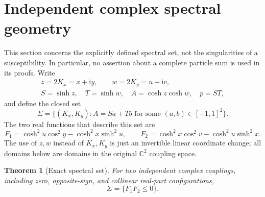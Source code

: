 \documentclass[11pt]{article}
\numberwithin{equation}{section}
\newtheorem{theorem}{Theorem}[section]
\theoremstyle{definition}
\newcommand{\C}{\mathbb C}
\newcommand{\ii}{\mathrm i}
\begin{document}
\clearpage
\tableofcontents
\clearpage

\section{Independent complex spectral geometry}
\label{geo:section}

This section concerns the explicitly defined spectral set, not the singularities
of a susceptibility.  In particular, no assertion about a complete particle
sum is used in its proofs.  Write
\[
 \begin{gathered}
 z=2K_x=x+\ii y,\qquad w=2K_y=u+\ii v,\\
 S=\sinh z,\quad T=\sinh w,\quad A=\cosh z\cosh w,\quad p=ST,
 \end{gathered}
\]
and define the closed set
\begin{equation}\label{geo:sigma}
 \Sigma=\{(K_x,K_y):A=S a+T b
                    \text{ for some }(a,b)\in[-1,1]^2\}.
\end{equation}
The two real functions that describe this set are
\begin{equation}\label{geo:F}
 F_1=\cosh^2u\cos^2y-\cosh^2x\sinh^2u,\qquad
 F_2=\cosh^2x\cos^2v-\cosh^2u\sinh^2x.
\end{equation}
The use of \(z,w\) instead of \(K_x,K_y\) is just an invertible linear
coordinate change; all domains below are domains in the original
\(\C^2\) coupling space.

\begin{theorem}[Exact spectral set]\label{geo:exact-sigma}
For two independent complex couplings, including zero, opposite-sign,
and collinear real-part configurations,
\begin{equation}\label{geo:sigma-F}
                         \Sigma=\{F_1F_2\leq0\}.
\end{equation}
\end{theorem}
\end{document}
